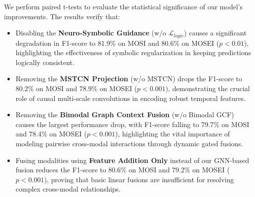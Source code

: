 \documentclass[sn-mathphys,Numbered]{sn-jnl}
\theoremstyle{thmstyleone}
\theoremstyle{thmstyletwo}
\theoremstyle{thmstylethree}
\begin{document}
We perform paired t-tests to evaluate the statistical significance of our model's improvements. The results verify that:
\begin{itemize}
    \item Disabling the \textbf{Neuro-Symbolic Guidance} (w/o $\mathcal{L}_{logic}$) causes a significant degradation in F1-score to 81.9\% on MOSI and 80.6\% on MOSEI ($p < 0.01$), highlighting the effectiveness of symbolic regularization in keeping predictions logically consistent.
    \item Removing the \textbf{MSTCN Projection} (w/o MSTCN) drops the F1-score to 80.2\% on MOSI and 78.9\% on MOSEI ($p < 0.001$), demonstrating the crucial role of causal multi-scale convolutions in encoding robust temporal features.
    \item Removing the \textbf{Bimodal Graph Context Fusion} (w/o Bimodal GCF) causes the largest performance drop, with F1-score falling to 79.7\% on MOSI and 78.4\% on MOSEI ($p < 0.001$), highlighting the vital importance of modeling pairwise cross-modal interactions through dynamic gated fusions.
    \item Fusing modalities using \textbf{Feature Addition Only} instead of our GNN-based fusion reduces the F1-score to 80.6\% on MOSI and 79.2\% on MOSEI ($p < 0.001$), proving that basic linear fusions are insufficient for resolving complex cross-modal relationships.
\end{itemize}
\end{document}
